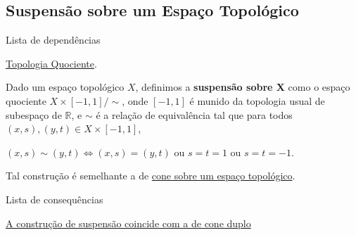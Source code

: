 \subsection{Suspensão sobre um Espaço Topológico}
\label{suspensao-def}
\begin{titlemize}{Lista de dependências}
	\item \hyperref[topologia-quociente-def]{Topologia Quociente}.
\end{titlemize}
\begin{defi}[Suspensão]
	Dado um espaço topológico $X$, definimos a \textbf{suspensão sobre X} como o espaço quociente $X\times [-1,1]/\sim$, onde $[-1,1]$ é munido da topologia usual de subespaço de $\mathbb{R}$, e $\sim$ é a relação de equivalência tal que para todos $(x,s),(y,t) \in X\times [-1,1]$,\\
    \centerline{
    $(x,s)\sim(y,t) \Leftrightarrow (x,s)=(y,t)$ ou $s=t=1$ ou $s=t=-1$.}
\end{defi}

Tal construção é semelhante a de \hyperref[cone-def]{cone sobre um espaço topológico}.

\begin{titlemize}{Lista de consequências}
	\item \hyperref[suspensao-cone-duplo-prop]{A construção de suspensão coincide com a de cone duplo}
\end{titlemize}
